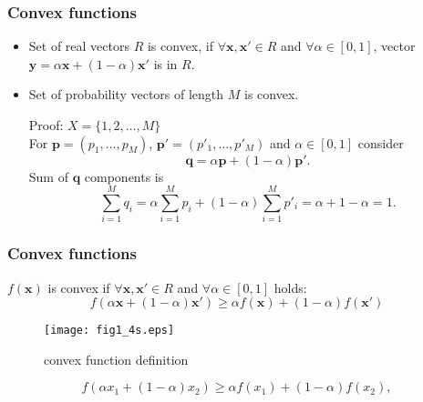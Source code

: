 \documentclass[14pt]{beamer}
\renewcommand{\vec}[1]{\ensuremath{\boldsymbol{#1}}}
\begin{document}

\begin{frame}
\frametitle{Convex functions}
\begin{itemize}

    \item Set of real vectors $R$ is convex, if $ \forall \vec x,\vec x' \in R$ and $\forall \alpha \in [0,1]$, vector $\vec y = \alpha \vec x + (1 - \alpha)\vec x'$ is in $R$.

    \item 
    \begin{theorem}
    \label{stoch}
    Set of probability vectors of length $M$ is convex.
    \end{theorem}
    \small{
    Proof:    
    $X=\{1,2,\dots,M\}$  \\
    For $\vec p = (p_1 ,...,p_M )$, $\vec p' = (p'_1 ,...,p'_M )$ and $\alpha \in [0,1]$ consider
    \[
    \vec q = \alpha \vec p + (1 - \alpha )\vec p'.
    \]
    Sum of $\vec q$ components is
    \[
    \sum\limits_{i = 1}^M {q_i } = \alpha \sum\limits_{i = 1}^M {p_i } + (1 -
    \alpha )\sum\limits_{i = 1}^M {{p}'_i } = \alpha + 1 - \alpha = 1.
    \]
    }
    
\end{itemize}
\end{frame}



\begin{frame}
\frametitle{Convex functions}
\begin{itemize}
\small{
    
    \item $f({\vec x})$ is convex if $\forall {\vec x},{\vec x}' \in R$ and $\forall \alpha \in [0,1]$ holds:
    \begin{equation}
    \label{eq1_4} f(\alpha {\vec x} + (1 - \alpha ){\vec x}') \ge \alpha
    f({\vec x}) + (1 - \alpha )f({\vec x}')
    \end{equation}
    
    \begin{figure}[ht]
    \begin{minipage}{1.0\linewidth}
    \begin{center}
    \texttt{[image: fig1\_4s.eps]}
    \caption{convex function definition} \label{confun}
    \end{center}
    \end{minipage}
    \end{figure}
    
    \item 
    \[
    f(\alpha x_1+ (1-\alpha )x_2) \ge \alpha f(x_1)+ (1-\alpha
    )f(x_2),
    \]
}
\end{itemize}
\end{frame}
\end{document}
